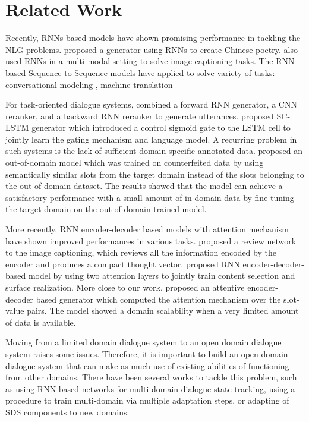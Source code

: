 \documentclass[11pt,a4paper]{article}
\begin{document}
\section{Related Work}\label{sec:relatedwork}
Recently, RNNs-based models have shown promising performance in tackling the NLG problems. \citet{zhang2014chinese} proposed a generator using RNNs to create Chinese poetry. \citet{xu2015show,karpathy2015deep,vinyals2015show} also used RNNs in a multi-modal setting to solve image captioning tasks. The RNN-based Sequence to Sequence models have applied to solve variety of tasks: conversational modeling \cite{vinyals2015neural,li2015diversity,li2016persona}, machine translation \cite{luong2015multi,li2016mutual}

For task-oriented dialogue systems, \citet{thwsjy15} combined a forward RNN generator, a CNN reranker, and a backward RNN reranker to generate utterances. \citet{wensclstm15} proposed SC-LSTM generator which introduced a control sigmoid gate to the LSTM cell to jointly learn the gating mechanism and language model. A recurring problem in such systems is the lack of sufficient domain-specific annotated data. \citet{wen2016multi} proposed an out-of-domain model which was trained on counterfeited data by using semantically similar slots from the target domain instead of the slots belonging to the out-of-domain dataset. The results showed that the model can achieve a satisfactory performance with a small amount of in-domain data by fine tuning the target domain on the out-of-domain trained model. 

More recently, RNN encoder-decoder based models with attention mechanism \cite{bahdanau2014neural} have shown improved performances in various tasks. \citet{yang2016review} proposed a review network to the image captioning, which reviews all the information encoded by the encoder and produces a compact thought vector. \citet{mei2015talk} proposed RNN encoder-decoder-based model by using two attention layers to jointly train content selection and surface realization. More close to our work, \citet{wentoward} proposed an attentive encoder-decoder based generator which computed the attention mechanism over the slot-value pairs. The model showed a domain scalability when a very limited amount of data is available.

Moving from a limited domain dialogue system to an open domain dialogue system raises some issues. Therefore, it is important to build an open domain dialogue system that can make as much use of existing abilities of functioning from other domains. There have been several works to tackle this problem, such as \cite{mrkvsic2015multi} using RNN-based networks for multi-domain dialogue state tracking, \cite{wen2016multi} using a procedure to train multi-domain via multiple adaptation steps, or \cite{gavsic2015distributed,williams2013multi} adapting of SDS components to new domains. 
\end{document}
